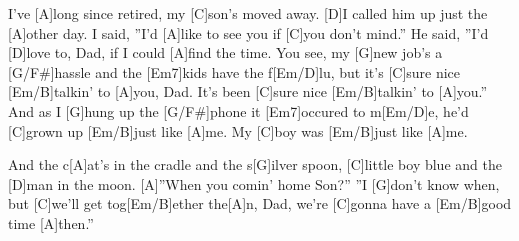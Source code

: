 \begin{guitar}



\pagebreak
I've [A]long since retired, my [C]son's moved away.
[D]I called him up just the [A]other day.
I said, ''I'd [A]like to see you if [C]you don't mind.''
He said, ''I'd [D]love to, Dad, if I could [A]find the time.
You see, my [G]new job's a [G/F#]hassle and the [Em7]kids have the f[Em/D]lu,
but it's [C]sure nice [Em/B]talkin' to [A]you, Dad.  It's been [C]sure nice [Em/B]talkin' to [A]you.''
And as I [G]hung up the [G/F#]phone it [Em7]occured to m[Em/D]e,
he'd [C]grown up [Em/B]just like [A]me.    My [C]boy was [Em/B]just like [A]me.



And the c[A]at's in the cradle and the s[G]ilver spoon,
[C]little boy blue and the [D]man in the moon.
[A]''When you comin' home Son?''  ''I [G]don't know when,
but [C]we'll get tog[Em/B]ether the[A]n, Dad, we're [C]gonna have a [Em/B]good time [A]then.''
\end{guitar}
